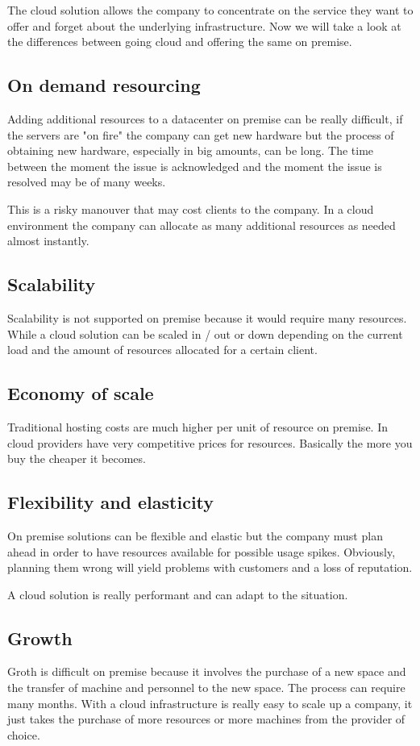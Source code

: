 The cloud solution allows the company to concentrate on the service they want to offer and forget about the underlying infrastructure. Now we will take a look at the differences between going cloud and offering the same on premise.

\subsection{On demand resourcing}
Adding additional resources to a datacenter on premise can be really difficult, if the servers are "on fire" the company can get new hardware but the process of obtaining new hardware, especially in big amounts, can be long. The time between the moment the issue is acknowledged and the moment the issue is resolved may be of many weeks.

This is a risky manouver that may cost clients to the company. In a cloud environment the company
can allocate as many additional resources as needed almost instantly.

\subsection{Scalability}
Scalability is not supported on premise because it would require many resources. While a cloud solution can be scaled in / out or down depending on the current load and the amount of resources allocated for a certain client.

\subsection{Economy of scale}
Traditional hosting costs are much higher per unit of resource on premise. In cloud providers have very competitive prices for resources. Basically the more you buy the cheaper it becomes.

\subsection{Flexibility and elasticity}
On premise solutions can be flexible and elastic but the company must plan ahead in order to have resources available for possible usage spikes. Obviously, planning them wrong will yield problems with customers and a loss of reputation.

A cloud solution is really performant and can adapt to the situation.

\subsection{Growth}
Groth is difficult on premise because it involves the purchase of a new space and the transfer of machine and personnel to the new space. The process can require many months. With a cloud infrastructure is really easy to scale up a company, it just takes the purchase of more resources or more machines from the provider of choice.

